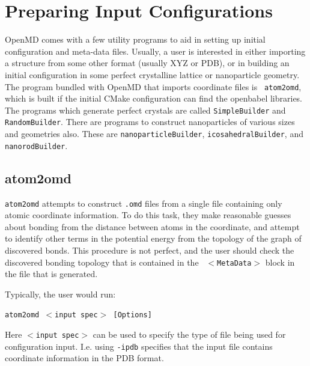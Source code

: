 \documentclass[]{book}
\begin{document}
\chapter{\label{section:PreparingInput} Preparing Input Configurations}

{\sc OpenMD} comes with a few utility programs to aid in setting up
initial configuration and meta-data files.  Usually, a user is
interested in either importing a structure from some other format
(usually XYZ or PDB), or in building an initial configuration in some
perfect crystalline lattice or nanoparticle geometry. The program
bundled with {\sc OpenMD} that imports coordinate files is {\tt
  atom2omd}, which is built if the initial CMake configuration can find
the openbabel libraries. The programs which generate perfect crystals
are called {\tt SimpleBuilder} and {\tt RandomBuilder}.  There are
programs to construct nanoparticles of various sizes and geometries
also.  These are {\tt nanoparticleBuilder}, {\tt icosahedralBuilder},
and {\tt nanorodBuilder}.

\section{\label{section:atom2omd}atom2omd}

{\tt atom2omd} attempts to construct {\tt .omd} files from a single file
containing only atomic coordinate information.  To do this task, they
make reasonable guesses about bonding from the distance between atoms
in the coordinate, and attempt to identify other terms in the
potential energy from the topology of the graph of discovered bonds.
This procedure is not perfect, and the user should check the
discovered bonding topology that is contained in the {\tt
  $<$MetaData$>$} block in the file that is generated.

Typically, the user would run:

{\tt atom2omd $<$input spec$>$ [Options]}

Here {\tt $<$input spec$>$} can be used to specify the type of file being
used for configuration input. I.e. using {\tt -ipdb} specifies that the
input file contains coordinate information in the PDB format.
\end{document}
